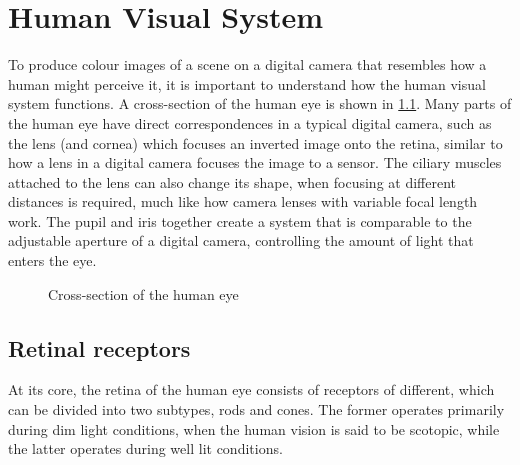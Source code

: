 \chapter{Human Visual System}%
\label{ch:hvs}

To produce colour images of a scene on a digital camera that resembles how a human might perceive it, it is important to understand how the human visual system functions. A cross-section of the human eye is shown in \ref{fig:humaneye}. Many parts of the human eye have direct correspondences in a typical digital camera, such as the lens (and cornea) which focuses an inverted image onto the retina, similar to how a lens in a digital camera focuses the image to a sensor. The ciliary muscles attached to the lens can also change its shape, when focusing at different distances is required, much like how camera lenses with variable focal length work. The pupil and iris together create a system that is comparable to the adjustable aperture of a digital camera, controlling the amount of light that enters the eye.

\begin{figure}
    \centering
    \caption{Cross-section of the human eye \cite{humaneye}}
    \label{fig:humaneye}
\end{figure}

\section{Retinal receptors}

At its core, the retina of the human eye consists of receptors of different, which can be divided into two subtypes, rods and cones. The former operates primarily during dim light conditions, when the human vision is said to be scotopic, while the latter operates during well lit conditions.


